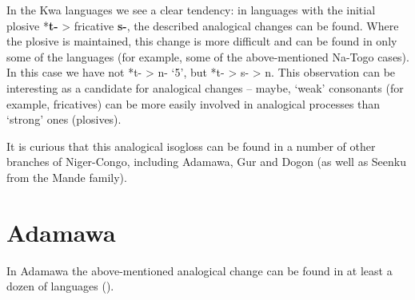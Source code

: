 \begin{table}
\caption{\label{tab:2:18}Kwa initial consonants in `3'-'5'}

\end{table}

In the Kwa languages we see a clear tendency: in languages with the initial plosive *\textbf{t-} > fricative \textbf{s-}, the described analogical changes can be found. Where the plosive is maintained, this change is more difficult and can be found in only some of the languages (for example, some of the above-mentioned Na-Togo cases). In this case we have not *t- > n- ‘5’, but *t- > s- > n. This observation can be interesting as a candidate for analogical changes – maybe, ‘weak’ consonants (for example, fricatives) can be more easily involved in analogical processes than ‘strong’ ones (plosives). 

It is curious that this analogical isogloss can be found in a number of other branches of Niger-Congo, including Adamawa, Gur and Dogon (as well as Seenku from the Mande family). 

 
\section{Adamawa}%

In Adamawa the above-mentioned analogical change can be found in at least a dozen of languages ().

